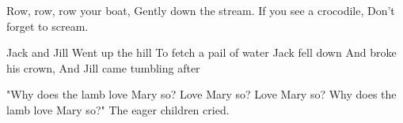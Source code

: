 \documentclass{article}
\begin{document}
	\setlength{\columnsep}{20pt}
	\setlength{\columnseprule}{1pt}
	\begin{multicols}{3}
		\lipsum[1-14]
	\end{multicols}

	\begin{multicols}{3}
		Row, row, row your boat,
		Gently down the stream.
		If you see a crocodile,
		Don't forget to scream.
		
		\columnbreak
		Jack and Jill
		Went up the hill
		To fetch a pail of water
		Jack fell down
		And broke his crown,
		And Jill came tumbling after
		
		\columnbreak
		"Why does the lamb love Mary so?
		Love Mary so? Love Mary so?
		Why does the lamb love Mary so?"
		The eager children cried.
	\end{multicols}
\end{document}
